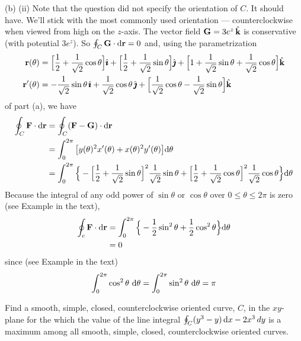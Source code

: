 \begin{solution}
\noindent (b) (ii) Note that the question did not specify the orientation
of $C$. It should have. We'll stick with the most commonly used orientation ---
counterclockwise when viewed from high on the $z$-axis.
The vector field $\mathbf{G}= 3 e^z\,\hat{\mathbf{k}}$
is conservative (with potential $3e^z$).
So $\oint_C\mathbf{G}\cdot\mathrm{d}\mathbf{r}=0$ and, using the parametrization 
\begin{align*}
\mathbf{r}(\theta) &= \Big[\frac{1}{2} +\frac{1}{\sqrt{2}}\cos\theta\Big]\hat{\pmb{\imath}} 
             +\Big[\frac{1}{2} +\frac{1}{\sqrt{2}}\sin\theta\Big]\hat{\pmb{\jmath}}
             +\Big[1 +\frac{1}{\sqrt{2}}\sin\theta
                     +\frac{1}{\sqrt{2}}\cos\theta\Big]\hat{\mathbf{k}} \\
\mathbf{r}'(\theta) &= -\frac{1}{\sqrt{2}}\sin\theta\,\hat{\pmb{\imath}} 
                +\frac{1}{\sqrt{2}}\cos\theta\,\hat{\pmb{\jmath}}
             +\Big[\frac{1}{\sqrt{2}}\cos\theta
                     -\frac{1}{\sqrt{2}}\sin\theta\Big]\hat{\mathbf{k}}
\end{align*}
of part (a), we have
\begin{align*}
\oint_C\mathbf{F}\cdot\mathrm{d}\mathbf{r}
&= \oint_C(\mathbf{F}-\mathbf{G})\cdot\mathrm{d}\mathbf{r} \\
&= \int_0^{2\pi} \big[y(\theta)^2x'(\theta) +x(\theta)^2y'(\theta)\big]
           \mathrm{d}\theta \\
&= \int_0^{2\pi} \Big\{-\Big[\frac{1}{2} +\frac{1}{\sqrt{2}}\sin\theta\Big]^2
                               \frac{1}{\sqrt{2}}\sin\theta
                       +\Big[\frac{1}{2} +\frac{1}{\sqrt{2}}\cos\theta\Big]^2
                               \frac{1}{\sqrt{2}}\cos\theta\Big\}
           \mathrm{d}\theta 
\end{align*}
Because the integral of any odd power of $\sin\theta$ or $\cos\theta$
over $0\le\theta\le 2\pi$ is zero (see Example 
in the  text),
\begin{align*}
\oint_c\mathbf{F}\cdot\mathrm{d}\mathbf{r}
&= \int_0^{2\pi} \Big\{-\frac{1}{2} \sin^2\theta
                       +\frac{1}{2} \cos^2\theta\Big\}
           \mathrm{d}\theta \\
&=0
\end{align*}
since  (see Example  in the  text)
\begin{equation*}
\int_0^{2\pi}\cos^2\theta\ \mathrm{d}\theta
=\int_0^{2\pi}\sin^2\theta\ \mathrm{d}\theta
=\pi
\end{equation*}
\end{solution}

\begin{question}
 Find a smooth, simple, closed, 
counterclockwise oriented curve, $C$, in the $xy$-plane for the which 
the value of the line integral
 $\oint_C(y^3-y)\,\mathrm{d}x-2x^3\,dy$ is a maximum among all 
smooth, simple, closed, counterclockwise oriented curves. 
\end{question}

